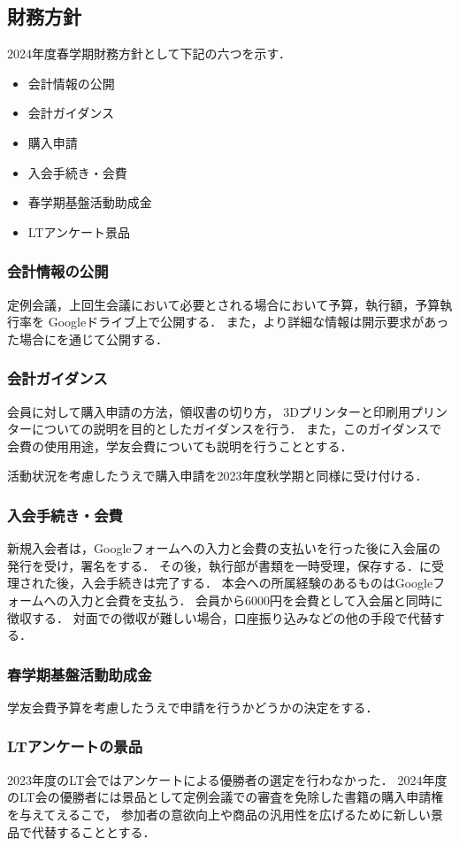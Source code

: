 \subsection*{財務方針}


2024年度春学期財務方針として下記の六つを示す．
\begin{itemize}
    \item 会計情報の公開
    \item 会計ガイダンス
    \item 購入申請
    \item 入会手続き・会費
    \item 春学期基盤活動助成金
    \item LTアンケート景品
\end{itemize}

\subsubsection*{会計情報の公開}
定例会議，上回生会議において必要とされる場合において予算，執行額，予算執行率を Googleドライブ上で公開する．
また，より詳細な情報は開示要求があった場合に\kaikeiStaff{}を通じて公開する．

\subsubsection*{会計ガイダンス}
会員に対して購入申請の方法，領収書の切り方， 3Dプリンターと印刷用プリンターについての説明を目的としたガイダンスを行う．
また，このガイダンスで会費の使用用途，学友会費についても説明を行うこととする．

活動状況を考慮したうえで購入申請を2023年度秋学期と同様に受け付ける．

\subsubsection*{入会手続き・会費}
新規入会者は，Googleフォームへの入力と会費の支払いを行った後に入会届の発行を受け，署名をする．
その後，執行部が書類を一時受理，保存する．\president{}に受理された後，入会手続きは完了する．
本会への所属経験のあるものはGoogleフォームへの入力と会費を支払う．
会員から6000円を会費として入会届と同時に徴収する．
対面での徴収が難しい場合，口座振り込みなどの他の手段で代替する．

\subsubsection*{春学期基盤活動助成金}
学友会費予算を考慮したうえで申請を行うかどうかの決定をする．

\subsubsection*{LTアンケートの景品}
2023年度のLT会ではアンケートによる優勝者の選定を行わなかった．
2024年度のLT会の優勝者には景品として定例会議での審査を免除した書籍の購入申請権を与えてえるこで，
参加者の意欲向上や商品の汎用性を広げるために新しい景品で代替することとする．


